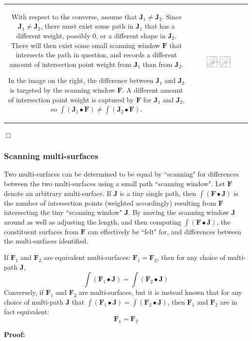 \begin{tabular}{cc}
\parbox{0.5\textwidth}{
With respect to the converse, assume that \(\mathbf{J}_1 \neq \mathbf{J}_2\). Since \(\mathbf{J}_1 \neq \mathbf{J}_2\), there must exist some path in \(\mathbf{J}_1\) that has a different weight, possibly \(0\), or a different shape in \(\mathbf{J}_2\). There will then exist some small scanning window \(\mathbf{F}\) that intersects the path in question, and records a different amount of intersection point weight from \(\mathbf{J}_1\) than from \(\mathbf{J}_2\).

In the image on the right, the difference between \(\mathbf{J}_1\) and \(\mathbf{J}_2\) is targeted by the scanning window \(\mathbf{F}\). A different amount of intersection point weight is captured by \(\mathbf{F}\) for \(\mathbf{J}_1\) and \(\mathbf{J}_2\), so \(\int (\mathbf{J}_1 \bullet \mathbf{F}) \neq \int (\mathbf{J}_2 \bullet \mathbf{F})\).
} & \parbox{0.5\textwidth}{
\includegraphics[width = 0.5\textwidth]{Point_totals/scanning_paths_using_surfaces}
}
\end{tabular}

\(\Box\)

\subsubsection{Scanning multi-surfaces}

Two multi-surfaces can be determined to be equal by ``scanning" for differences between the two multi-surfaces using a small path ``scanning window". Let \(\mathbf{F}\) denote an arbitrary multi-surface. If \(\mathbf{J}\) is a tiny single path, then \(\int (\mathbf{F} \bullet \mathbf{J})\) is the number of intersection points (weighted accordingly) resulting from \(\mathbf{F}\) intersecting the tiny ``scanning window" \(\mathbf{J}\). By moving the scanning window \(\mathbf{J}\) around as well as adjusting the length, and then computing \(\int (\mathbf{F} \bullet \mathbf{J})\), the constituent surfaces from \(\mathbf{F}\) can effectively be ``felt" for, and differences between the multi-surfaces identified.  

\begin{thm}\label{thm:scanning_surfaces}
If \(\mathbf{F}_1\) and \(\mathbf{F}_2\) are equivalent multi-surfaces: \(\mathbf{F}_1 = \mathbf{F}_2\), then for any choice of multi-path \(\mathbf{J}\), 
\[\int (\mathbf{F}_1 \bullet \mathbf{J}) = \int (\mathbf{F}_2 \bullet \mathbf{J})\]
Conversely, if \(\mathbf{F}_1\) and \(\mathbf{F}_2\) are multi-surfaces, but it is instead known that for any choice of multi-path \(\mathbf{J}\) that 
\(\int (\mathbf{F}_1 \bullet \mathbf{J}) = \int (\mathbf{F}_2 \bullet \mathbf{J})\), then \(\mathbf{F}_1\) and \(\mathbf{F}_2\) are in fact equivalent:
\[\mathbf{F}_1 = \mathbf{F}_2\]  
\end{thm}
\textbf{Proof:}

